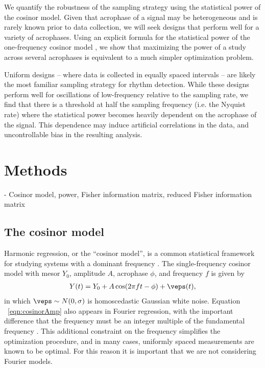 We quantify the robustness of the sampling strategy using the statistical power of the cosinor model.  Given that acrophase of a signal may be heterogeneous and is rarely known prior to data collection, we will seek designs that perform well for a variety of acrophases. Using an explicit formula for the statistical power of the one-frequency cosinor model \cite{}, we show that maximizing the power of a study across several acrophases is equivalent to a much simpler optimization problem.
 

Uniform designs -- where data is collected in equally spaced intervals -- are likely the most familiar sampling strategy for rhythm detection. While these designs perform well for  oscillations of low-frequency relative to the sampling rate, we find that there is a threshold at half the sampling frequency (i.e. the Nyquist rate) where the statistical power becomes heavily dependent on the acrophase of the signal. This dependence may induce artificial correlations in the data, and uncontrollable bias in the resulting analysis. 


\section{Methods}
- Cosinor model, power, Fisher information matrix, reduced Fisher information matrix

\subsection{The cosinor model}\label{sec:cosinor}
Harmonic regression, or the ``cosinor model'', is a common statistical framework for studying systems with a dominant frequency \cite{cornelissen2014cosinor}. The single-frequency cosinor model with mesor $Y_0$, amplitude $A$, acrophase $\phi$, and frequency $f$ is given by 
\begin{align}
    Y(t) =Y_0+ A \cos(2\pi f t - \phi) + \veps(t) \label{eqn:cosinorAmp},
\end{align}
in which $\veps \sim N(0,\sigma)$ is homoscedastic Gaussian white noise. Equation ~\eqref{eqn:cosinorAmp} also appears in Fourier regression, with the important difference that the frequency must be an integer multiple of the fundamental frequency \cite{TDOO}. This additional constraint on the frequency simplifies the optimization procedure, and in many cases, uniformly spaced measurements are known to be optimal. For this reason it is important that we are not considering Fourier models.

